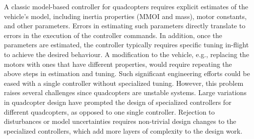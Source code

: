 
A classic model-based controller for quadcopters requires explicit estimates of the vehicle's model, including inertia properties (MMOI and mass), motor constants, and other parameters.
%
Errors in estimating such parameters directly translate to errors in the execution of the controller commands.
%
In addition, once the parameters are estimated, the controller typically requires specific tuning in-flight to achieve the desired behaviour.
%
%
%
A modification to the vehicle, e.g., replacing the motors with ones that have different properties, would require repeating the above steps in estimation and tuning.
%
Such significant engineering efforts could be eased with a single controller without specialized tuning. However, this problem raises several challenges since quadcopters are unstable systems. 
%
Large variations in quadcopter design have prompted the design of specialized controllers for different quadcopters, as opposed to one single controller. 
%
Rejection to disturbances or model uncertainties requires non-trivial design changes to the specialized controllers, which add more layers of complexity to the design work.
%

